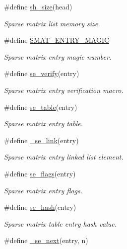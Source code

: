 \begin{CompactItemize}
\#define \hyperlink{group__dbprim__smat_ga53}{sh\_\-size}(head)
\begin{CompactList}\small\item\em Sparse matrix list memory size. \item\end{CompactList}\item 
\#define \hyperlink{group__dbprim__smat_ga54}{SMAT\_\-ENTRY\_\-MAGIC}
\begin{CompactList}\small\item\em Sparse matrix entry magic number. \item\end{CompactList}\item 
\#define \hyperlink{group__dbprim__smat_ga55}{se\_\-verify}(entry)
\begin{CompactList}\small\item\em Sparse matrix entry verification macro. \item\end{CompactList}\item 
\#define \hyperlink{group__dbprim__smat_ga56}{se\_\-table}(entry)
\begin{CompactList}\small\item\em Sparse matrix entry table. \item\end{CompactList}\item 
\#define \hyperlink{group__dbprim__smat_ga57}{\_\-se\_\-link}(entry)
\begin{CompactList}\small\item\em Sparse matrix entry linked list element. \item\end{CompactList}\item 
\#define \hyperlink{group__dbprim__smat_ga58}{se\_\-flags}(entry)
\begin{CompactList}\small\item\em Sparse matrix entry flags. \item\end{CompactList}\item 
\#define \hyperlink{group__dbprim__smat_ga59}{se\_\-hash}(entry)
\begin{CompactList}\small\item\em Sparse matrix table entry hash value. \item\end{CompactList}\item 
\#define \hyperlink{group__dbprim__smat_ga60}{\_\-se\_\-next}(entry, n)

\end{CompactItemize}
